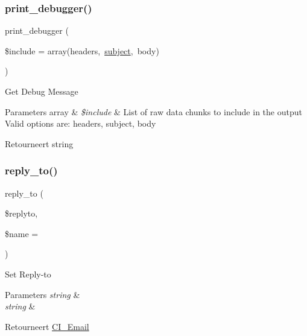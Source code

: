 \subsubsection{\texorpdfstring{print\_debugger()}{print\_debugger()}}
{\footnotesize\ttfamily print\+\_\+debugger (\begin{DoxyParamCaption}\item[{}]{\$include = {\ttfamily array(\textquotesingle{}headers\textquotesingle{},~\textquotesingle{}\mbox{\hyperlink{class_c_i___email_aaa61b3aaa6cc4c90e26686e4bf41587a}{subject}}\textquotesingle{},~\textquotesingle{}body\textquotesingle{})} }\end{DoxyParamCaption})}

Get Debug Message


\begin{DoxyParams}[1]{Parameters}
array & {\em \$include} & List of raw data chunks to include in the output Valid options are\+: \textquotesingle{}headers\textquotesingle{}, \textquotesingle{}subject\textquotesingle{}, \textquotesingle{}body\textquotesingle{} \\
\hline
\end{DoxyParams}
\begin{DoxyReturn}{Retourneert}
string 
\end{DoxyReturn}
\mbox{\label{class_c_i___email_a1ee2303dece90d5b3afbb5dc75b9a0ca}} 
\subsubsection{\texorpdfstring{reply\_to()}{reply\_to()}}
{\footnotesize\ttfamily reply\+\_\+to (\begin{DoxyParamCaption}\item[{}]{\$replyto,  }\item[{}]{\$name = {\ttfamily \textquotesingle{}\textquotesingle{}} }\end{DoxyParamCaption})}

Set Reply-\/to


\begin{DoxyParams}{Parameters}
{\em string} & \\
\hline
{\em string} & \\
\hline
\end{DoxyParams}
\begin{DoxyReturn}{Retourneert}
\mbox{\hyperlink{class_c_i___email}{C\+I\+\_\+\+Email}} 
\end{DoxyReturn}
\mbox{\label{class_c_i___email_a547a65a81ba2d1f98cc15121a45dab11}} 
